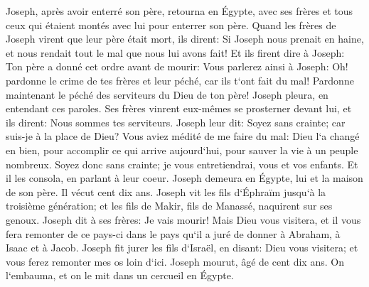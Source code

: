 \verse Joseph, après avoir enterré son père, retourna en Égypte, avec ses frères et tous ceux qui étaient montés avec lui pour enterrer son père. 
\verse Quand les frères de Joseph virent que leur père était mort, ils dirent: Si Joseph nous prenait en haine, et nous rendait tout le mal que nous lui avons fait! 
\verse Et ils firent dire à Joseph: Ton père a donné cet ordre avant de mourir: 
\verse Vous parlerez ainsi à Joseph: Oh! pardonne le crime de tes frères et leur péché, car ils t`ont fait du mal! Pardonne maintenant le péché des serviteurs du Dieu de ton père! Joseph pleura, en entendant ces paroles. 
\verse Ses frères vinrent eux-mêmes se prosterner devant lui, et ils dirent: Nous sommes tes serviteurs. 
\verse Joseph leur dit: Soyez sans crainte; car suis-je à la place de Dieu? 
\verse Vous aviez médité de me faire du mal: Dieu l`a changé en bien, pour accomplir ce qui arrive aujourd`hui, pour sauver la vie à un peuple nombreux. 
\verse Soyez donc sans crainte; je vous entretiendrai, vous et vos enfants. Et il les consola, en parlant à leur coeur. 
\verse Joseph demeura en Égypte, lui et la maison de son père. Il vécut cent dix ans. 
\verse Joseph vit les fils d`Éphraïm jusqu`à la troisième génération; et les fils de Makir, fils de Manassé, naquirent sur ses genoux. 
\verse Joseph dit à ses frères: Je vais mourir! Mais Dieu vous visitera, et il vous fera remonter de ce pays-ci dans le pays qu`il a juré de donner à Abraham, à Isaac et à Jacob. 
\verse Joseph fit jurer les fils d`Israël, en disant: Dieu vous visitera; et vous ferez remonter mes os loin d`ici. 
\verse Joseph mourut, âgé de cent dix ans. On l`embauma, et on le mit dans un cercueil en Égypte. 
